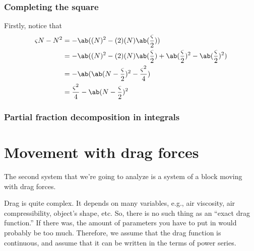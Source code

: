 \subsubsection{Completing the square}

Firstly, notice that
\begin{align}
	\varsigma N - N^2 & = - \ab((N)^2 - (2)(N)\ab(\frac{\varsigma}{2}))                                                          \\
	                  & = -\ab((N)^2 - (2)(N)\ab(\frac{\varsigma}{2}) + \ab(\frac{\varsigma}{2})^2 - \ab(\frac{\varsigma}{2})^2) \\
	                  & = -\ab(\ab(N - \frac{\varsigma}{2})^2 - \frac{\varsigma^2}{4})                                           \\
	                  & = \frac{\varsigma^2}{4} - \ab(N - \frac{\varsigma}{2})^2
\end{align}

\subsubsection{Partial fraction decomposition in integrals}

\section{Movement with drag forces}

The second system that we're going to analyze is a system of a block moving with drag forces.

Drag is quite complex. It depends on many variables, e.g., air viscosity, air compressibility, object's shape, etc. So, there is no such thing as an \enquote{exact drag function.} If there was, the amount of parameters you have to put in would probably be too much. Therefore, we assume that the drag function is continuous, and assume that it can be written in the terms of power series.

